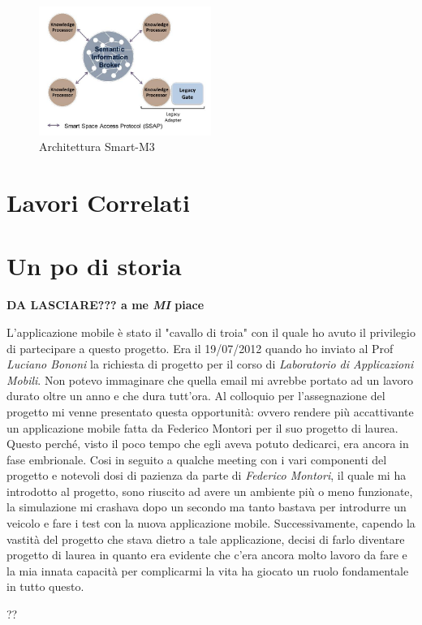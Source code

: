 \begin{figure}[H]
	\centering
	\includegraphics[width=0.5\textwidth]{assets/smart-m3.jpg}
	\caption{Architettura Smart-M3}
	\label{fig:smart-m3}
\end{figure}

\section{Lavori Correlati}

\section{Un po di storia} 

\textbf{DA LASCIARE??? a me \emph{MI} piace}

L'applicazione mobile è stato il "cavallo di troia" con il quale ho avuto il privilegio di partecipare a questo progetto. Era il 19/07/2012 quando ho inviato al Prof \emph{Luciano Bononi} la richiesta di progetto per il corso di \emph{Laboratorio di Applicazioni Mobili}. Non potevo immaginare che quella email mi avrebbe portato ad un lavoro durato oltre un anno e che dura tutt'ora.
Al colloquio per l'assegnazione del progetto mi venne presentato questa opportunità: ovvero rendere più accattivante un applicazione mobile fatta da Federico Montori per il suo progetto di laurea. Questo perché, visto il poco tempo che egli aveva potuto dedicarci, era ancora in fase embrionale.
Cosi in seguito a qualche meeting con i vari componenti del progetto e notevoli dosi di pazienza da parte di \emph{Federico Montori}, il quale mi ha introdotto al progetto, sono riuscito ad avere un ambiente più o meno funzionate, la simulazione mi crashava dopo un secondo ma tanto bastava per introdurre un veicolo e fare i test con la nuova applicazione mobile.
Successivamente, capendo la vastità del progetto che stava dietro a tale applicazione, decisi di farlo diventare progetto di laurea in quanto era evidente che c'era ancora molto lavoro da fare e la mia innata capacità per complicarmi la vita ha giocato un ruolo fondamentale in tutto questo.

??

